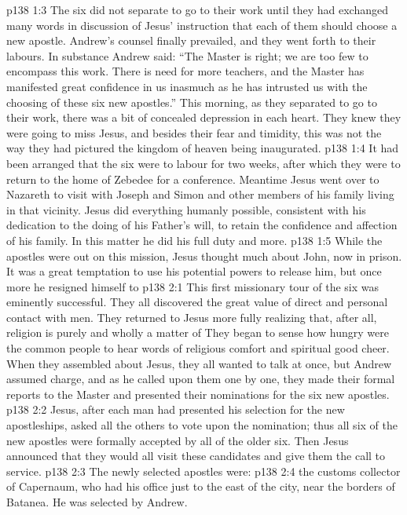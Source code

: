 \vs p138 1:3 The six did not separate to go to their work until they had exchanged many words in discussion of Jesus’ instruction that each of them should choose a new apostle. Andrew’s counsel finally prevailed, and they went forth to their labours. In substance Andrew said: “The Master is right; we are too few to encompass this work. There is need for more teachers, and the Master has manifested great confidence in us inasmuch as he has intrusted us with the choosing of these six new apostles.” This morning, as they separated to go to their work, there was a bit of concealed depression in each heart. They knew they were going to miss Jesus, and besides their fear and timidity, this was not the way they had pictured the kingdom of heaven being inaugurated.
\vs p138 1:4 It had been arranged that the six were to labour for two weeks, after which they were to return to the home of Zebedee for a conference. Meantime Jesus went over to Nazareth to visit with Joseph and Simon and other members of his family living in that vicinity. Jesus did everything humanly possible, consistent with his dedication to the doing of his Father’s will, to retain the confidence and affection of his family. In this matter he did his full duty and more.
\vs p138 1:5 While the apostles were out on this mission, Jesus thought much about John, now in prison. It was a great temptation to use his potential powers to release him, but once more he resigned himself to 
\vs p138 2:1 This first missionary tour of the six was eminently successful. They all discovered the great value of direct and personal contact with men. They returned to Jesus more fully realizing that, after all, religion is purely and wholly a matter of  They began to sense how hungry were the common people to hear words of religious comfort and spiritual good cheer. When they assembled about Jesus, they all wanted to talk at once, but Andrew assumed charge, and as he called upon them one by one, they made their formal reports to the Master and presented their nominations for the six new apostles.
\vs p138 2:2 Jesus, after each man had presented his selection for the new apostleships, asked all the others to vote upon the nomination; thus all six of the new apostles were formally accepted by all of the older six. Then Jesus announced that they would all visit these candidates and give them the call to service.
\vs p138 2:3 The newly selected apostles were:
\vs p138 2:4 \bibnobreakspace {} the customs collector of Capernaum, who had his office just to the east of the city, near the borders of Batanea. He was selected by Andrew.
